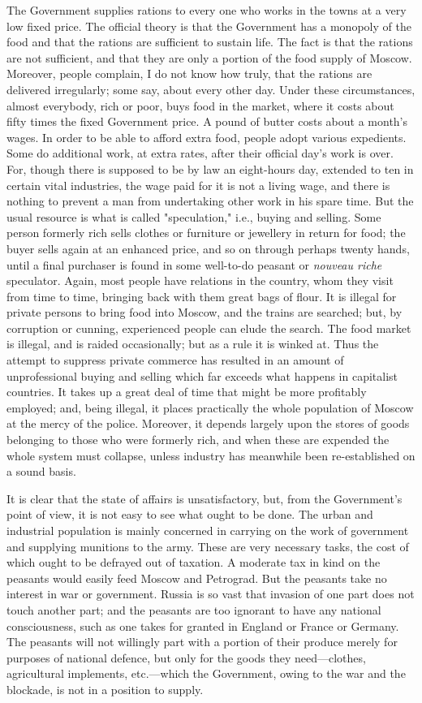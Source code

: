 The Government supplies rations to every one who works in the towns at a very low fixed price. The official theory is that the Government has a monopoly of the food and that the rations are sufficient to sustain life. The fact is that the rations are not sufficient, and that they are only a portion of the food supply of Moscow. Moreover, people complain, I do not know how truly, that the rations are delivered irregularly; some say, about every other day. Under these circumstances, almost everybody, rich or poor, buys food in the market, where it costs about fifty times the fixed Government price. A pound of butter costs about a month's wages. In order to be able to afford extra food, people adopt various expedients. Some do additional work, at extra rates, after their official day's work is over. For, though there is supposed to be by law an eight-hours day, extended to ten in certain vital industries, the wage paid for it is not a living wage, and there is nothing to prevent a man from undertaking other work in his spare time. But the usual resource is what is called "speculation," i.e., buying and selling. Some person formerly rich sells clothes or furniture or jewellery in return for food; the buyer sells again at an enhanced price, and so on through perhaps twenty hands, until a final purchaser is found in some well-to-do peasant or \emph{nouveau riche} speculator. Again, most people have relations in the country, whom they visit from time to time, bringing back with them great bags of flour. It is illegal for private persons to bring food into Moscow, and the trains are searched; but, by corruption or cunning, experienced people can elude the search. The food market is illegal, and is raided occasionally; but as a rule it is winked at. Thus the attempt to suppress private commerce has resulted in an amount of unprofessional buying and selling which far exceeds what happens in capitalist countries. It takes up a great deal of time that might be more profitably employed; and, being illegal, it places practically the whole population of Moscow at the mercy of the police. Moreover, it depends largely upon the stores of goods belonging to those who were formerly rich, and when these are expended the whole system must collapse, unless industry has meanwhile been re-established on a sound basis.

It is clear that the state of affairs is unsatisfactory, but, from the Government's point of view, it is not easy to see what ought to be done. The urban and industrial population is mainly concerned in carrying on the work of government and supplying munitions to the army. These are very necessary tasks, the cost of which ought to be defrayed out of taxation. A moderate tax in kind on the peasants would easily feed Moscow and Petrograd. But the peasants take no interest in war or government. Russia is so vast that invasion of one part does not touch another part; and the peasants are too ignorant to have any national consciousness, such as one takes for granted in England or France or Germany. The peasants will not willingly part with a portion of their produce merely for purposes of national defence, but only for the goods they need---clothes, agricultural implements, etc.---which the Government, owing to the war and the blockade, is not in a position to supply.

